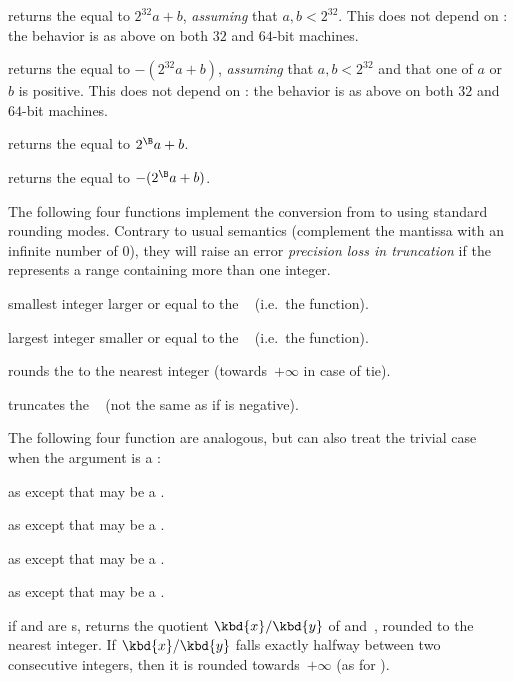  returns the  equal to $2^{32} a +
b$, \emph{assuming} that $a,b < 2^{32}$. This does not depend on
: the behavior is as above on both $32$ and $64$-bit
machines.

 returns the  equal to
$- (2^{32} a + b)$, \emph{assuming} that $a,b < 2^{32}$ and that one of $a$
or $b$ is positive. This does not depend on : the behavior
is as above on both $32$ and $64$-bit machines.

 returns the  equal to
$2^{\B} a + b$.

 returns the  equal to
$-(2^{\B} a + b)$.

The following four functions implement the conversion from  to
 using standard rounding modes. Contrary to usual semantics
(complement the mantissa with an infinite number of 0), they will raise an
error \emph{precision loss in truncation} if the  represents a
range containing more than one integer.

 smallest integer larger or equal
to the ~ (i.e.~the  function).

 largest integer smaller or equal to the
~ (i.e.~the  function).

 rounds the   to the nearest integer
(towards~$+\infty$ in case of tie).

 truncates the ~ (not the same as
 if  is negative).

The following four function are analogous, but can also treat the trivial
case when the argument is a :

as  except that  may be a .

as  except that  may be a .

as  except that  may be a .

as  except that  may be a .

 if  and  are s,
returns the quotient $\kbd{x}/\kbd{y}$ of  and~, rounded to
the nearest integer. If $\kbd{x}/\kbd{y}$ falls exactly halfway between
two consecutive integers, then it is rounded towards~$+\infty$ (as for
).

